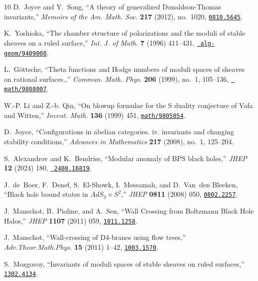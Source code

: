\documentclass[12pt,letterpaper]{JHEP3}
\begin{document}
\begin{thebibliography}{10}
	D.~Joyce and Y.~Song, ``{A theory of generalized Donaldson-Thomas
		invariants},'' {\em {Memoirs of the Am. Math. Soc.}} {\bf 217} (2012),
	no.~1020,
	\href{http://www.arXiv.org/abs/0810.5645}{{\tt 0810.5645}}.
	
	K.~Yoshioka, ``{The chamber structure of polarizations and the moduli of stable
		sheaves on a ruled surface},'' {\em Int. J. of Math.} {\bf 7} (1996)
	411--431, \href{http://www.arXiv.org/abs/alg-geom/9409008}{{\tt
			alg-geom/9409008}}.
	
	L.~G{\"o}ttsche, ``{Theta functions and Hodge numbers of moduli spaces of
		sheaves on rational surfaces.},'' {\em Commun. Math. Phys.} {\bf 206} (1999),
	no.~1, 105--136, \href{http://www.arXiv.org/abs/math/9808007}{{\tt
			math/9808007}}.
	
	W.-P. Li and Z.-b. Qin, ``{On blowup formulae for the S duality conjecture of
		Vafa and Witten},'' {\em Invent. Math.} {\bf 136} (1999) 451,
	\href{http://www.arXiv.org/abs/math/9805054}{{\tt math/9805054}}.
	
	D.~Joyce, ``Configurations in abelian categories. iv. invariants and changing
	stability conditions,'' {\em Advances in Mathematics} {\bf 217} (2008),
	no.~1, 125--204.
	
	S.~Alexandrov and K.~Bendriss, ``{Modular anomaly of BPS black holes},'' {\em
		JHEP} {\bf 12} (2024) 180, \href{http://www.arXiv.org/abs/2408.16819}{{\tt
			2408.16819}}.
	
	J.~de~Boer, F.~Denef, S.~El-Showk, I.~Messamah, and D.~Van~den Bleeken,
	``{Black hole bound states in $AdS_3\times S^2$},'' {\em JHEP} {\bf 0811}
	(2008) 050,
	\href{http://www.arXiv.org/abs/0802.2257}{{\tt 0802.2257}}.
	
	J.~Manschot, B.~Pioline, and A.~Sen, ``{Wall Crossing from Boltzmann Black Hole
		Halos},'' {\em JHEP} {\bf 1107} (2011) 059,
	\href{http://www.arXiv.org/abs/1011.1258}{{\tt 1011.1258}}.
	
	J.~Manschot, ``{Wall-crossing of D4-branes using flow trees},'' {\em
		Adv.Theor.Math.Phys.} {\bf 15} (2011) 1--42,
	\href{http://www.arXiv.org/abs/1003.1570}{{\tt 1003.1570}}.
	
	S.~Mozgovoy, ``{Invariants of moduli spaces of stable sheaves on ruled
		surfaces},''
	\href{http://www.arXiv.org/abs/1302.4134}{{\tt 1302.4134}}.
	

\end{thebibliography}
\end{document}
